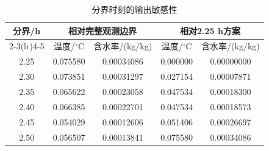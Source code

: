 \begin{table}[H]\centering\small
\caption{分界时刻的输出敏感性}\label{tab:q2_sensitivity}
\begin{tabular}{ccccc}
\toprule
分界/h & \multicolumn{2}{c}{相对完整观测边界} & \multicolumn{2}{c}{相对2.25 h方案}\\\cmidrule(lr){2-3}\cmidrule(lr){4-5} & 温度/$^\circ$C & 含水率/(kg/kg) & 温度/$^\circ$C & 含水率/(kg/kg)\\\midrule
2.25 & 0.075580 & 0.00034086 & 0.000000 & 0.00000000\\
2.30 & 0.073851 & 0.00031297 & 0.027154 & 0.00007871\\
2.35 & 0.065622 & 0.00023058 & 0.047534 & 0.00018300\\
2.40 & 0.066385 & 0.00022701 & 0.047534 & 0.00018573\\
2.45 & 0.054029 & 0.00012606 & 0.051406 & 0.00026697\\
2.50 & 0.056507 & 0.00013841 & 0.075580 & 0.00034086\\
\bottomrule\end{tabular}\end{table}
